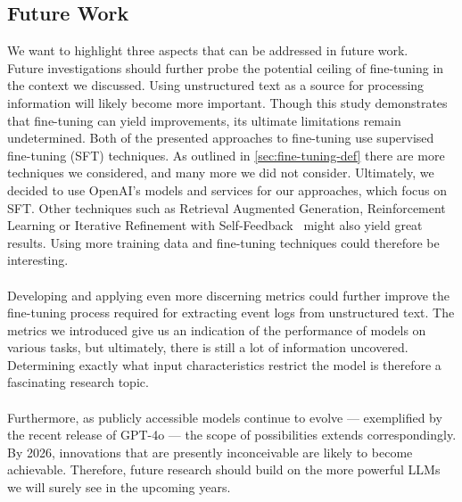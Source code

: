 \subsection{Future Work}\label{sec:future_work}
We want to highlight three aspects that can be addressed in future work.\\
Future investigations should further probe the potential ceiling of fine-tuning in the context we discussed. Using unstructured text as a source for processing information will likely become more important. Though this study demonstrates that fine-tuning can yield improvements, its ultimate limitations remain undetermined. Both of the presented approaches to fine-tuning use supervised fine-tuning (SFT) techniques. As outlined in \autoref{sec:fine-tuning-def} there are more techniques we considered, and many more we did not consider. Ultimately, we decided to use OpenAI's models and services for our approaches, which focus on SFT. Other techniques such as Retrieval Augmented Generation, Reinforcement Learning\cite{ovadia_fine-tuning_2024} or Iterative Refinement with Self-Feedback~\cite{madaan_self-refine_2023} might also yield great results. 
Using more training data and fine-tuning techniques could therefore be interesting.\\\\
Developing and applying even more discerning metrics could further improve the fine-tuning process required for extracting event logs from unstructured text. The metrics we introduced give us an indication of the performance of models on various tasks, but ultimately, there is still a lot of information uncovered. Determining exactly what input characteristics restrict the model is therefore a fascinating research topic.\\\\
Furthermore, as publicly accessible models continue to evolve — exemplified by the recent release of GPT-4o — the scope of possibilities extends correspondingly. By 2026, innovations that are presently inconceivable are likely to become achievable. Therefore, future research should build on the more powerful LLMs we will surely see in the upcoming years.
